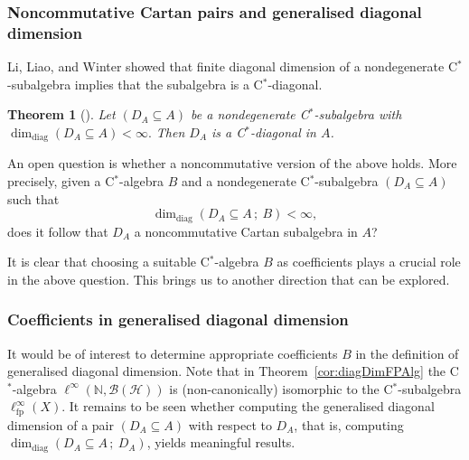 \documentclass[a4paper]{amsart}
\newcommand{\myhyp}{\textnormal{-}\hskip0pt\relax}
\numberwithin{equation}{section}
\newcommand{\N}{\mathbb{N}}
\newcommand{\Bcal}{\mathcal{B}}
\newcommand{\Hcal}{\mathcal{H}}
\newcommand{\cstar}{C$^\ast$\myhyp{}algebra}
\newcommand{\cstarSub}{C$^\ast$\myhyp{}subalgebra}
\newcommand{\cstarDiag}{C$^\ast$\myhyp{}diagonal}
\newcommand{\bop}[1]{\Bcal({#1})}
\newcommand{\CfpCartan}[1]{\ell^{\infty}_{\mathrm{fp}}({#1})}
\newcommand{\ddim}[2]{\dim_{\mathrm{diag}}({#1}\subseteq{#2})}
\newcommand{\ddimn}[3]{\dim_{\mathrm{diag}}({#1}\subseteq{#2}\, ;~{#3})}
\theoremstyle{plain}
\newtheorem{thm}{Theorem}[section]
\theoremstyle{indented}
\numberwithin{equation}{section}
\theoremstyle{definition}
\theoremstyle{remark}
\theoremstyle{plain}
\theoremstyle{definition}
\begin{document}
\smallskip
\subsubsection{Noncommutative Cartan pairs and generalised diagonal dimension}

Li, Liao, and Winter showed that finite diagonal dimension of a nondegenerate \cstarSub{} implies that the subalgebra is a \cstarDiag{}.

\begin{thm}[{\cite[Theorem~2.10]{LiLiaoWinter2023diagDim}}] \label{thm:diagDimImpliesCdiagonal}
Let ${(D_A \subseteq A)}$ be a nondegenerate \cstarSub{} with ${\ddim{D_A}{A}<\infty}.$ 
Then $D_A$ is a \cstarDiag{} in $A$.
\end{thm}

An open question is whether a noncommutative version of the above holds. 
More precisely, given a \cstar{} $B$ and
a nondegenerate \cstarSub{} ${(D_A \subseteq A)}$ such that 
    \[\ddimn{D_A}{A}{B}<\infty,\]
does it follow that $D_A$ a noncommutative Cartan subalgebra in $A$?

It is clear that choosing a suitable \cstar{} $B$ as 
coefficients
plays a crucial role in the above question.
This brings us to another direction that can be explored.

\smallskip
\subsubsection{Coefficients in generalised diagonal dimension}

It would be of interest to determine appropriate coefficients $B$ in the definition of generalised diagonal dimension.
Note that in Theorem~\ref{cor:diagDimFPAlg} the \cstar{} $\ell^\infty(\N,\bop{\Hcal})$ is (non\myhyp{}canonically) isomorphic to the \cstarSub{} $\CfpCartan{X}$.
It remains to be seen whether computing the generalised diagonal dimension of a pair ${(D_A \subseteq A)}$ with respect to ${D_A}$, that is, computing ${\ddimn{D_A}{A}{D_A}}$,
yields meaningful results.




\end{document}
